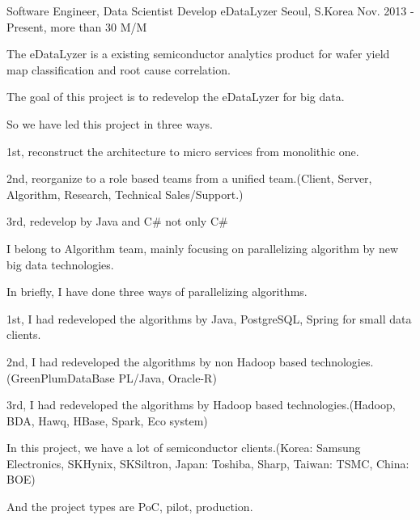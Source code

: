 

\begin{cventries}

  \cventry
    {Software Engineer, Data Scientist} %
    {Develop eDataLyzer} %
    {Seoul, S.Korea} %
    {Nov. 2013 - Present, more than 30 M/M} %
    {
      \begin{cvitems} %
        \item {The eDataLyzer is a existing semiconductor analytics product for wafer yield map classification and root cause correlation.}
        \item {The goal of this project is to redevelop the eDataLyzer for big data.}
        \item {So we have led this project in three ways.}
        \item {1st, reconstruct the architecture to micro services from monolithic one.}
        \item {2nd, reorganize to a role based teams from a unified team.(Client, Server, Algorithm, Research, Technical Sales/Support.)}
        \item {3rd, redevelop by Java and C\# not only C\#}
        \item {I belong to Algorithm team, mainly focusing on parallelizing algorithm by new big data technologies.}
        \item {In briefly, I have done three ways of parallelizing algorithms.}
        \item {1st, I had redeveloped the algorithms by Java, PostgreSQL, Spring for small data clients.}
        \item {2nd, I had redeveloped the algorithms by non Hadoop based technologies.(GreenPlumDataBase PL/Java, Oracle-R)}
        \item {3rd, I had redeveloped the algorithms by Hadoop based technologies.(Hadoop, BDA, Hawq, HBase, Spark, Eco system)}
        \item {In this project, we have a lot of semiconductor clients.(Korea: Samsung Electronics, SKHynix, SKSiltron, Japan: Toshiba, Sharp, Taiwan: TSMC, China: BOE)}
        \item {And the project types are PoC, pilot, production.}
      \end{cvitems}
    }


\end{cventries}
